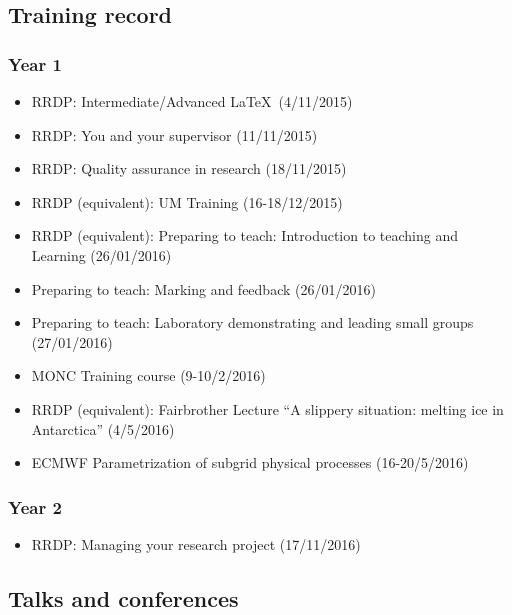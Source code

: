 \documentclass[11pt,a4paper]{article}
\begin{document}
\subsection*{Training record}
\subsubsection*{Year 1}

\begin{itemize}
  \item RRDP: Intermediate/Advanced \LaTeX\ (4/11/2015)
  \item RRDP: You and your supervisor (11/11/2015)
  \item RRDP: Quality assurance in research (18/11/2015)
  \item RRDP (equivalent): UM Training (16-18/12/2015)
  \item RRDP (equivalent): Preparing to teach: Introduction to teaching and Learning (26/01/2016)
  \item Preparing to teach: Marking and feedback (26/01/2016)
  \item Preparing to teach: Laboratory demonstrating and leading small groups (27/01/2016)
  \item MONC Training course (9-10/2/2016)
  \item RRDP (equivalent): Fairbrother Lecture ``A slippery situation: melting ice in Antarctica'' (4/5/2016)
  \item ECMWF Parametrization of subgrid physical processes (16-20/5/2016)
\end{itemize}

\subsubsection*{Year 2}

\begin{itemize}
  \item RRDP: Managing your research project (17/11/2016)
\end{itemize}

\subsection*{Talks and conferences}
\end{document}
